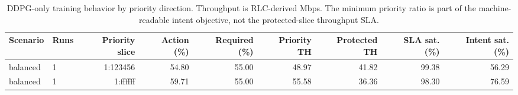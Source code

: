 \begin{table}[t]
\centering
\caption{DDPG-only training behavior by priority direction. Throughput is RLC-derived Mbps. The minimum priority ratio is part of the machine-readable intent objective, not the protected-slice throughput SLA.}
\label{tab:ddpg-only-priority}
\begin{tabular}{llrrrrrrr}
\toprule
Scenario & Runs & Priority slice & Action (\%) & Required (\%) & Priority TH & Protected TH & SLA sat. (\%) & Intent sat. (\%)\\
\midrule
balanced & 1 & 1:123456 & 54.80 & 55.00 & 48.97 & 41.82 & 99.38 & 56.29 \\
balanced & 1 & 1:ffffff & 59.71 & 55.00 & 55.58 & 36.36 & 98.30 & 76.59 \\
\bottomrule
\end{tabular}
\end{table}
